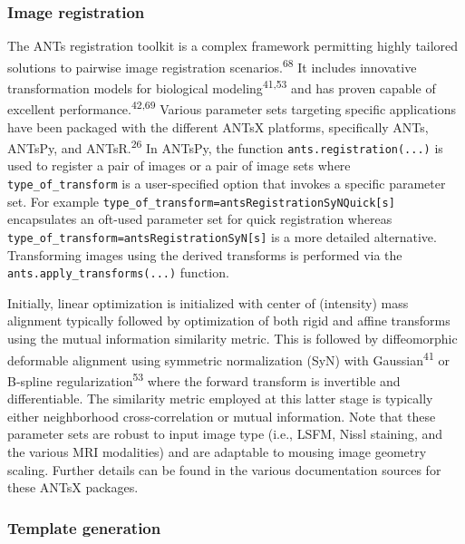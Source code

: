 \documentclass[
  12pt,
]{article}
\begin{document}
\hypertarget{image-registration}{%
\subsubsection{Image registration}\label{image-registration}}

The ANTs registration toolkit is a complex framework permitting highly
tailored solutions to pairwise image registration
scenarios.\textsuperscript{68} It includes innovative transformation
models for biological modeling\textsuperscript{41,53} and has proven
capable of excellent performance.\textsuperscript{42,69} Various
parameter sets targeting specific applications have been packaged with
the different ANTsX platforms, specifically ANTs, ANTsPy, and
ANTsR.\textsuperscript{26} In ANTsPy, the function
\texttt{ants.registration(...)} is used to register a pair of images or
a pair of image sets where \texttt{type\_of\_transform} is a
user-specified option that invokes a specific parameter set. For example
\texttt{type\_of\_transform=\textquotesingle{}antsRegistrationSyNQuick{[}s{]}\textquotesingle{}}
encapsulates an oft-used parameter set for quick registration whereas
\texttt{type\_of\_transform=\textquotesingle{}antsRegistrationSyN{[}s{]}\textquotesingle{}}
is a more detailed alternative. Transforming images using the derived
transforms is performed via the \texttt{ants.apply\_transforms(...)}
function.

Initially, linear optimization is initialized with center of (intensity)
mass alignment typically followed by optimization of both rigid and
affine transforms using the mutual information similarity metric. This
is followed by diffeomorphic deformable alignment using symmetric
normalization (SyN) with Gaussian\textsuperscript{41} or B-spline
regularization\textsuperscript{53} where the forward transform is
invertible and differentiable. The similarity metric employed at this
latter stage is typically either neighborhood cross-correlation or
mutual information. Note that these parameter sets are robust to input
image type (i.e., LSFM, Nissl staining, and the various MRI modalities)
and are adaptable to mousing image geometry scaling. Further details can
be found in the various documentation sources for these ANTsX packages.

\hypertarget{template-generation}{%
\subsubsection{Template generation}\label{template-generation}}
\end{document}
